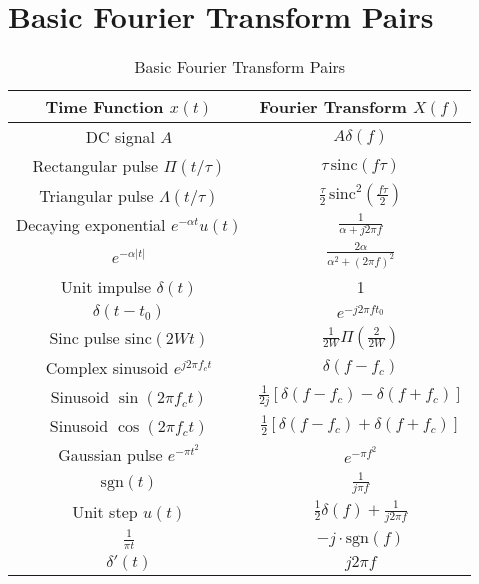 \documentclass[10pt]{article}
\begin{document}
\section{Basic Fourier Transform Pairs}
\begin{table}[h!]
    \centering
    \renewcommand{\arraystretch}{1.5}
    \begin{tabular}{c|c}
        \hline
        \textbf{Time Function \( x(t) \)} & \textbf{Fourier Transform \( X(f) \)} \\
        \hline
        DC signal \( A \) & \( A \delta(f) \) \\
        \hline
        Rectangular pulse \( \Pi(t/\tau) \) & \( \tau \, \text{sinc}(f \tau) \) \\
        \hline
        Triangular pulse \( \Lambda(t/\tau) \) & \( \frac{\tau}{2} \, \text{sinc}^2\left(\frac{f \tau}{2}\right) \) \\
        \hline
        Decaying exponential \( e^{-\alpha t} u(t) \) & \( \frac{1}{\alpha + j2\pi f} \) \\
        \hline
        \( e^{-\alpha |t|} \) & \( \frac{2\alpha}{\alpha^2 + (2\pi f)^2} \) \\
        \hline
        Unit impulse \( \delta(t) \) & 1 \\
        \hline
        \( \delta(t - t_0) \) & \( e^{-j2\pi f t_0} \) \\
        \hline
        Sinc pulse \( \text{sinc}(2Wt) \) & \( \frac{1}{2W} \Pi\left(\frac{2}{2W}\right) \) \\
        \hline
        Complex sinusoid \( e^{j2\pi f_c t} \) & \( \delta(f - f_c) \) \\
        \hline
        Sinusoid \( \sin(2\pi f_c t) \) & \( \frac{1}{2j} [\delta(f - f_c) - \delta(f + f_c)] \) \\
        \hline
        Sinusoid \( \cos(2\pi f_c t) \) & \( \frac{1}{2} [\delta(f - f_c) + \delta(f + f_c)] \) \\
        \hline
        Gaussian pulse \( e^{-\pi t^2} \) & \( e^{-\pi f^2} \) \\
        \hline
        \( \text{sgn}(t) \) & \( \frac{1}{j \pi f} \) \\
        \hline
        Unit step \( u(t) \) & \( \frac{1}{2} \delta(f) + \frac{1}{j2\pi f} \) \\
        \hline
        \( \frac{1}{\pi t} \) & \( -j\cdot\text{sgn}(f) \) \\
        \hline
        \( \delta'(t) \) & \( j2\pi f \) \\
        \hline
    \end{tabular}
    \caption{Basic Fourier Transform Pairs}
\end{table}
\end{document}
